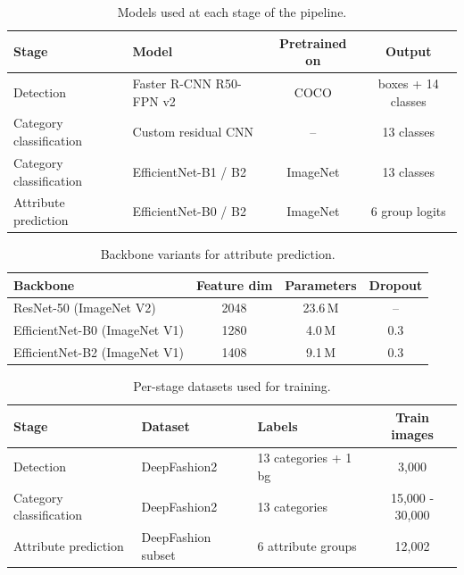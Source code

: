 \documentclass{article}
\begin{document}
\begin{table}[H]
\centering
\begin{tabular}{llcc}
\toprule
Stage & Model & Pretrained on & Output \\
\midrule
Detection                & Faster R-CNN R50-FPN v2 & COCO         & boxes + 14 classes \\
Category classification  & Custom residual CNN     & --           & 13 classes \\
Category classification  & EfficientNet-B1 / B2    & ImageNet     & 13 classes \\
Attribute prediction     & EfficientNet-B0 / B2    & ImageNet     & 6 group logits \\
\bottomrule
\end{tabular}
\caption{Models used at each stage of the pipeline.}
\label{tab:models}
\end{table}

\begin{table}[H]
\centering
\begin{tabular}{lccc}
\toprule
Backbone & Feature dim & Parameters & Dropout \\
\midrule
ResNet-50 (ImageNet V2)        & 2048 & 23.6\,M & --   \\
EfficientNet-B0 (ImageNet V1)  & 1280 & 4.0\,M  & 0.3  \\
EfficientNet-B2 (ImageNet V1)  & 1408 & 9.1\,M  & 0.3  \\
\bottomrule
\end{tabular}
\caption{Backbone variants for attribute prediction.}
\label{tab:attr_backbones}
\end{table}

\begin{table}[H]
\centering
\begin{tabular}{lllc}
\toprule
Stage & Dataset & Labels & Train images \\
\midrule
Detection                & DeepFashion2          & 13 categories + 1 bg & 3{,}000  \\
Category classification  & DeepFashion2          & 13 categories        & 15{,}000 - 30{,}000       \\
Attribute prediction     & DeepFashion subset    & 6 attribute groups   & 12{,}002 \\
\bottomrule
\end{tabular}
\caption{Per-stage datasets used for training.}
\label{tab:datasets}
\end{table}
\end{document}
